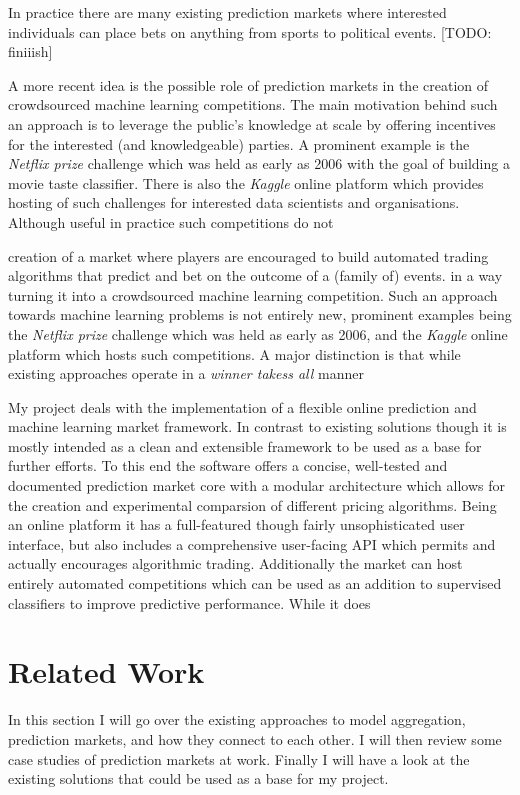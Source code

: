 \documentclass[bsc,frontabs,twoside,singlespacing,parskip,deptreport]{infthesis}     %
\begin{document}
	In practice there are many existing prediction markets where interested individuals can place bets on anything from sports to political events. [TODO: finiiish]

	A more recent idea is the possible role of prediction markets in the creation of crowdsourced machine learning competitions. The main motivation behind such an approach is to leverage the public's knowledge at scale by offering incentives for the interested (and knowledgeable) parties. A prominent example is the {\em Netflix prize} challenge which was held as early as 2006 with the goal of building a movie taste classifier. There is also the {\em Kaggle} online platform which provides hosting of such challenges for interested data scientists and organisations. Although useful in practice such competitions do not 
	
	creation of a market where players are encouraged to build automated trading algorithms that predict and bet on the outcome of a (family of) events.  in a way turning it into a crowdsourced machine learning competition. Such an approach towards machine learning problems is not entirely new, prominent examples being the {\em Netflix prize} challenge which was held as early as 2006, and the {\em Kaggle} online platform which hosts such competitions. A major distinction is that while existing approaches operate in a {\em winner takess all} manner

	My project deals with the implementation of a flexible online prediction and machine learning market framework. In contrast to existing solutions  though it is mostly intended as a clean and extensible framework to be used as a base for further efforts. To this end the software offers a concise, well-tested and documented prediction market core with a modular architecture which allows for the creation and experimental comparsion of different pricing algorithms. Being an online platform it has a full-featured though fairly unsophisticated user interface, but also includes a comprehensive user-facing API which permits and actually encourages algorithmic trading. Additionally the market can host entirely automated competitions which can be used as an addition to supervised classifiers to improve predictive performance. 
	While it does 

\chapter{Related Work}

	In this section I will go over the existing approaches to model aggregation, prediction markets, and how they connect to each other. I will then review some case studies of prediction markets at work. Finally I will have a look at the existing solutions that could be used as a base for my project. 
\end{document}
